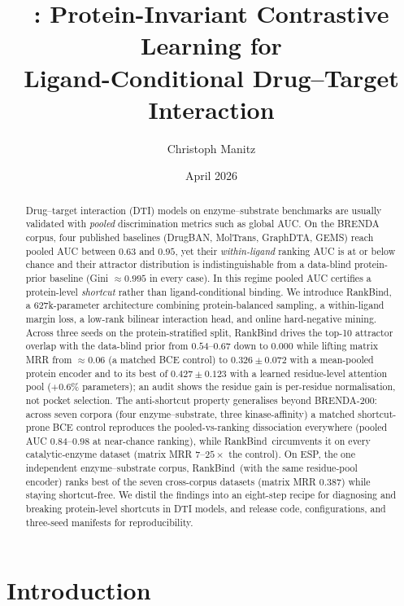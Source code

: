 \documentclass[11pt,a4paper]{article}
\title{\textbf{\method: Protein-Invariant Contrastive Learning for\\
Ligand-Conditional Drug--Target Interaction}}
\author[1]{Christoph Manitz}
\affil[1]{Leipzig University, Germany \\
\texttt{christoph.manitz@uni-leipzig.de}}
\date{April 2026}
\newcommand{\method}{RankBind\xspace}
\begin{document}
\maketitle

\begin{abstract}
Drug--target interaction (DTI) models on enzyme--substrate benchmarks are
usually validated with \emph{pooled} discrimination metrics such as global
AUC. On the BRENDA corpus, four published baselines (DrugBAN, MolTrans,
GraphDTA, GEMS) reach pooled AUC between $0.63$ and $0.95$, yet their
\emph{within-ligand} ranking AUC is at or below chance and their attractor
distribution is indistinguishable from a data-blind protein-prior baseline
(Gini $\approx 0.995$ in every case). In this regime pooled AUC certifies a
protein-level \emph{shortcut} rather than ligand-conditional binding. We
introduce \method, a $627$k-parameter architecture combining protein-balanced
sampling, a within-ligand margin loss, a low-rank bilinear interaction head,
and online hard-negative mining. Across three seeds on the protein-stratified
split, \method drives the top-10 attractor overlap with the data-blind prior
from $0.54$--$0.67$ down to $0.000$ while lifting matrix MRR from
$\approx\!0.06$ (a matched BCE control) to $0.326 \pm 0.072$ with a mean-pooled
protein encoder and to its best of $0.427 \pm 0.123$ with a learned
residue-level attention pool ($+0.6\%$ parameters); an audit shows the residue
gain is per-residue normalisation, not pocket selection. The
anti-shortcut property generalises beyond BRENDA-200: across seven corpora
(four enzyme--substrate, three kinase-affinity) a matched shortcut-prone BCE
control reproduces the pooled-vs-ranking dissociation everywhere (pooled AUC
$0.84$--$0.98$ at near-chance ranking), while \method\ circumvents it on every
catalytic-enzyme dataset (matrix MRR $7$--$25\times$ the control). On ESP, the
one independent enzyme--substrate corpus, \method\ (with the same residue-pool
encoder) ranks best of the seven cross-corpus datasets (matrix MRR $0.387$)
while staying shortcut-free. We distil the
findings into an eight-step recipe for diagnosing and breaking protein-level
shortcuts in DTI models, and release code, configurations, and three-seed
manifests for reproducibility.
\end{abstract}

\section{Introduction}
\label{sec:intro}
\end{document}
